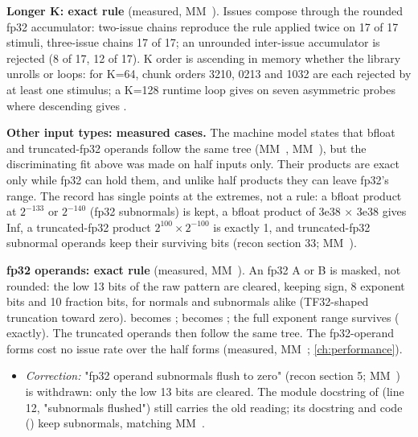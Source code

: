 \textbf{Longer K: exact rule} (measured, MM~). Issues compose through the rounded fp32 accumulator: two-issue chains
reproduce the rule applied twice on 17 of 17 stimuli, three-issue chains 17 of 17; an unrounded inter-issue
accumulator is rejected (8 of 17, 12 of 17). K order is ascending in memory whether the library unrolls or loops: for
K=64, chunk orders 3210, 0213 and 1032 are each rejected by at least one stimulus; a K=128 runtime loop gives
 on seven asymmetric probes where descending gives .

\textbf{Other input types: measured cases.} The machine model states that bfloat and truncated-fp32
operands follow the same tree (MM~, MM~), but the discriminating fit above was made on half inputs only.
Their products are exact only while fp32 can hold them, and unlike half products they can leave fp32's range. The
record has single points at the extremes, not a rule: a bfloat product at $2^{-133}$ or $2^{-140}$ (fp32 subnormals) is
kept, a bfloat product of 3e38 × 3e38 gives Inf, a truncated-fp32 product $2^{100} \times 2^{-100}$ is exactly 1, and
truncated-fp32 subnormal operands keep their surviving bits (recon section 33; MM~).

\textbf{fp32 operands: exact rule} (measured, MM~). An fp32 A or B is masked, not rounded: the low 13 bits of the raw
pattern are cleared, keeping sign, 8 exponent bits and 10 fraction bits, for normals and subnormals alike (TF32-shaped
truncation toward zero).  becomes ;  becomes ; the full exponent
range survives ( exactly). The truncated operands then follow the same tree. The fp32-operand forms
cost no issue rate over the half forms (measured, MM~; \cref{ch:performance}).

\begin{itemize}
\item \emph{Correction:} "fp32 operand subnormals flush to zero" (recon section 5; MM~) is withdrawn: only the low 13 bits are
  cleared. The module docstring of  (line 12, "subnormals flushed") still
  carries the old reading; its  docstring and code () keep subnormals, matching MM~.
\end{itemize}

